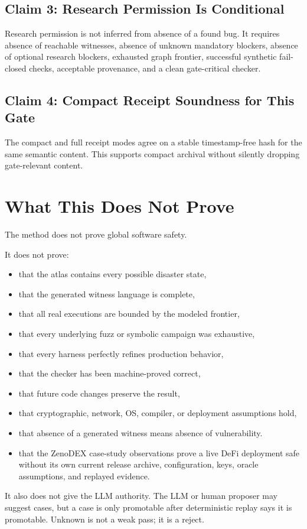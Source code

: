 \documentclass[11pt]{article}
\begin{document}
\subsection{Claim 3: Research Permission Is Conditional}
Research permission is not inferred from absence of a found bug. It requires absence of reachable witnesses, absence of unknown mandatory blockers, absence of optional research blockers, exhausted graph frontier, successful synthetic fail-closed checks, acceptable provenance, and a clean gate-critical checker.

\subsection{Claim 4: Compact Receipt Soundness for This Gate}
The compact and full receipt modes agree on a stable timestamp-free hash for the same semantic content. This supports compact archival without silently dropping gate-relevant content.

\section{What This Does Not Prove}
The method does not prove global software safety.

It does not prove:

\begin{itemize}
\item that the atlas contains every possible disaster state,
\item that the generated witness language is complete,
\item that all real executions are bounded by the modeled frontier,
\item that every underlying fuzz or symbolic campaign was exhaustive,
\item that every harness perfectly refines production behavior,
\item that the checker has been machine-proved correct,
\item that future code changes preserve the result,
\item that cryptographic, network, OS, compiler, or deployment assumptions hold,
\item that absence of a generated witness means absence of vulnerability.
\item that the ZenoDEX case-study observations prove a live DeFi deployment safe
without its own current release archive, configuration, keys, oracle
assumptions, and replayed evidence.
\end{itemize}
It also does not give the LLM authority. The LLM or human proposer may suggest cases, but a case is only promotable after deterministic replay says it is promotable. Unknown is not a weak pass; it is a reject.
\end{document}
